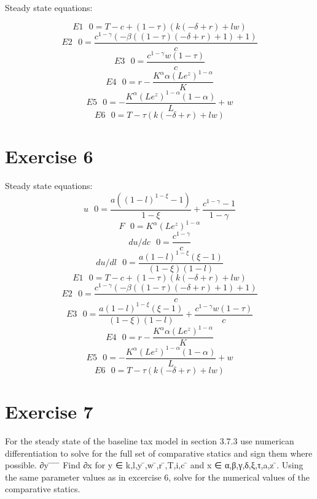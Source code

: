 \documentclass[a4paper]{article}
\begin{document}
Steady state equations:

$$ E1 \text{  }
 0 =  T - c + \left(1 - \tau\right) \left(k \left(- \delta + r\right) + l w\right) $$
$$ E2 \text{  }
 0 =  \frac{c^{1 - \gamma} \left(- \beta \left(\left(1 - \tau\right) \left(- \delta + r\right) + 1\right) + 1\right)}{c} $$
$$ E3 \text{  }
 0 =  \frac{c^{1 - \gamma} w \left(1 - \tau\right)}{c} $$
$$ E4 \text{  }
 0 =  r - \frac{K^{\alpha} \alpha \left(L e^{z}\right)^{1 - \alpha}}{K} $$
$$ E5 \text{  }
 0 =  - \frac{K^{\alpha} \left(L e^{z}\right)^{1 - \alpha} \left(1 - \alpha\right)}{L} + w $$
$$ E6 \text{  }
 0 =  T - \tau \left(k \left(- \delta + r\right) + l w\right) $$
\section*{Exercise 6}
Steady state equations:
$$ u \text{  }
 0 =  \frac{a \left(\left(1 - l\right)^{1 - \xi} - 1\right)}{1 - \xi} + \frac{c^{1 - \gamma} - 1}{1 - \gamma} $$
$$ F \text{  }
 0 =  K^{\alpha} \left(L e^{z}\right)^{1 - \alpha} $$
$$ du/dc \text{  }
 0 =  \frac{c^{1 - \gamma}}{c} $$
$$ du/dl \text{  }
 0 =  \frac{a \left(1 - l\right)^{1 - \xi} \left(\xi - 1\right)}{\left(1 - \xi\right) \left(1 - l\right)} $$
$$ E1 \text{  }
 0 =  T - c + \left(1 - \tau\right) \left(k \left(- \delta + r\right) + l w\right) $$
$$ E2 \text{  }
 0 =  \frac{c^{1 - \gamma} \left(- \beta \left(\left(1 - \tau\right) \left(- \delta + r\right) + 1\right) + 1\right)}{c} $$
$$ E3 \text{  }
 0 =  \frac{a \left(1 - l\right)^{1 - \xi} \left(\xi - 1\right)}{\left(1 - \xi\right) \left(1 - l\right)} + \frac{c^{1 - \gamma} w \left(1 - \tau\right)}{c} $$
$$ E4 \text{  }
 0 =  r - \frac{K^{\alpha} \alpha \left(L e^{z}\right)^{1 - \alpha}}{K} $$
$$ E5 \text{  }
 0 =  - \frac{K^{\alpha} \left(L e^{z}\right)^{1 - \alpha} \left(1 - \alpha\right)}{L} + w $$
$$ E6 \text{  }
 0 =  T - \tau \left(k \left(- \delta + r\right) + l w\right) $$



\section*{Exercise 7}

For the steady state of the baseline tax model in section 3.7.3 use numerican differentiation to solve for the full set of comparative statics and sign them where possible.
∂y  ̄ ̄  ̄ ̄
Find ∂x for y ∈ {k,l,y ̄,w ̄,r ̄,T,i,c ̄} and x ∈ {α,β,γ,δ,ξ,τ,a,z ̄}.
Using the same parameter values as in excercise 6, solve for the numerical values of the comparative statics.
\end{document}
